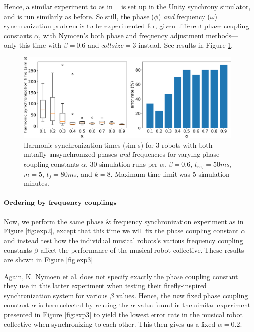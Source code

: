 		Hence, a similar experiment to as in [] is set up in the Unity synchrony simulator, and is run similarly as before. So still, the phase ($\phi$) \textit{and} frequency ($\omega$) synchronization problem is to be experimented for, given different phase coupling constants $\alpha$, with Nymoen's both phase and frequency adjustment methods—only this time with $\beta=0.6$ and $collsize=3$ instead. See results in Figure \ref{fig:exp2_1}.
		
		\begin{figure}[ht!]
			\centering
			\includegraphics[width=\linewidth]{Assets/DocSegments/Chapters/ExperimentsAndResults/Figures/PerfScores/experiment2_1_perfScores.pdf}
			\caption{Harmonic synchronization times (sim s) for 3 robots with both initially unsynchronized phases \textit{and} frequencies for varying phase coupling constants $\alpha$. 30 simulation runs per $\alpha$. $\beta=0.6$, $t_{ref}=50ms$, $m=5$, $t_f=80ms$, and $k=8$. Maximum time limit was 5 simulation minutes.}
			\label{fig:exp2_1}
		\end{figure}
		
	
		\paragraph{Ordering by frequency couplings}
		
		Now, we perform the same phase \& frequency synchronization experiment as in Figure \ref{fig:exp2}, except that this time we will fix the phase coupling constant $\alpha$ and instead test how the individual musical robots's various frequency coupling constants $\beta$ affect the performance of the musical robot collective. These results are shown in Figure \ref{fig:exp3}
		
		Again, K. Nymoen et al. does not specify exactly the phase coupling constant they use in this latter experiment when testing their firefly-inspired synchronization system for various $\beta$ values. Hence, the now fixed phase coupling constant $\alpha$ is here selected by reusing the $\alpha$ value found in the similar experiment presented in Figure \ref{fig:exp3} to yield the lowest error rate in the musical robot collective when synchronizing to each other. This then gives us a fixed $\alpha = 0.2$.
		
